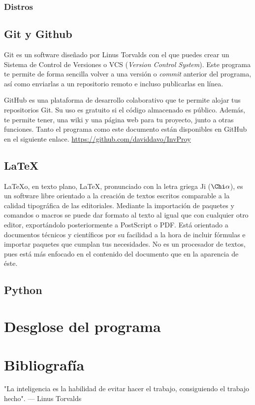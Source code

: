 \documentclass[a4paper, 11pt, twoside]{article} %
\begin{document}
\subsubsection{Distros}

\subsection{Git y Github}
Git es un software diseñado por Linus Torvalds con el que puedes crear un Sistema de Control de Versiones o VCS (\textit{Version Control System}). Este programa te permite de forma sencilla volver a una versión o \textit{commit} anterior del programa, así como enviarlas a un repositorio remoto e incluso publicarlas en línea.

GitHub es una plataforma de desarrollo colaborativo que te permite alojar tus repositorios Git. Su uso es gratuito si el código almacenado es público. Además, te permite tener, una wiki y una página web para tu proyecto, junto a otras funciones.
Tanto el programa como este documento están disponibles en GitHub en el siguiente enlace. \url{https://github.com/daviddavo/InvProy}

\subsection{LaTeX}
\LaTeX\space o, en texto plano, LaTeX, pronunciado con la letra griega 
Ji ($\Chi\alpha$), es un software libre orientado a la creación de textos escritos comparable a la calidad tipográfica de las editoriales. Mediante la importación de paquetes y comandos o macros se puede dar formato al texto al igual que con cualquier otro editor, exportándolo posteriormente a PostScript o PDF. Está orientado a documentos técnicos y científicos por su facilidad a la hora de incluir fórmulas e importar paquetes que cumplan tus necesidades. No es un procesador de textos, pues está más enfocado en el contenido del documento que en la aparencia de éste.

\subsection{Python}

\section{Desglose del programa}
\newpage{}
\section{Bibliografía}
\printbibliography

\newpage
\thispagestyle{empty}
\vspace*{\fill}
\begin{displayquote}"La inteligencia es la habilidad de evitar hacer el trabajo, consiguiendo el trabajo hecho". --- Linus Torvalds
\end{displayquote} 
\doclicenseThis
\vspace*{\fill}
\end{document}
